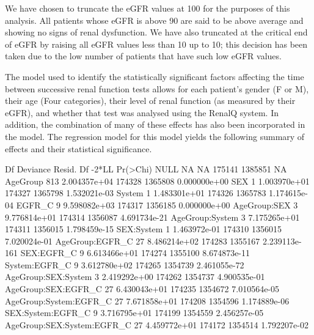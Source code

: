 


We have chosen to truncate the eGFR values at 100 for the purposes of this analysis. All patients whose eGFR is above 90 are said to be above average and showing no signs of renal dysfunction. We have also truncated at the critical end of eGFR by raising all eGFR values less than 10 up to 10; this decision has been taken due to the low number of patients that have such low eGFR values.

The model  used to identify the statistically significant factors affecting the time between successive renal function tests allows for each patient's gender (F or M), their age (Four categories), their level of renal function (as measured by their eGFR), and whether that test was analysed using the RenalQ system. In addition, the combination of many of these effects has also been incorporated in the model. The regression model for this model yields  the following summary of effects and their statistical significance.
\begin{Schunk}
\begin{Soutput}
                            Df     Deviance Resid. Df   -2*LL      Pr(>Chi)
NULL                        NA           NA    175141 1385851            NA
AgeGroup                   813 2.004357e+04    174328 1365808  0.000000e+00
SEX                          1 1.003970e+01    174327 1365798  1.532021e-03
System                       1 1.483301e+01    174326 1365783  1.174615e-04
EGFR_C                       9 9.598082e+03    174317 1356185  0.000000e+00
AgeGroup:SEX                 3 9.776814e+01    174314 1356087  4.691734e-21
AgeGroup:System              3 7.175265e+01    174311 1356015  1.798459e-15
SEX:System                   1 1.463972e-01    174310 1356015  7.020024e-01
AgeGroup:EGFR_C             27 8.486214e+02    174283 1355167 2.239113e-161
SEX:EGFR_C                   9 6.613466e+01    174274 1355100  8.674873e-11
System:EGFR_C                9 3.612780e+02    174265 1354739  2.461055e-72
AgeGroup:SEX:System          3 2.419292e+00    174262 1354737  4.900535e-01
AgeGroup:SEX:EGFR_C         27 6.430043e+01    174235 1354672  7.010564e-05
AgeGroup:System:EGFR_C      27 7.671858e+01    174208 1354596  1.174889e-06
SEX:System:EGFR_C            9 3.716795e+01    174199 1354559  2.456257e-05
AgeGroup:SEX:System:EGFR_C  27 4.459772e+01    174172 1354514  1.792207e-02
\end{Soutput}
\end{Schunk}
